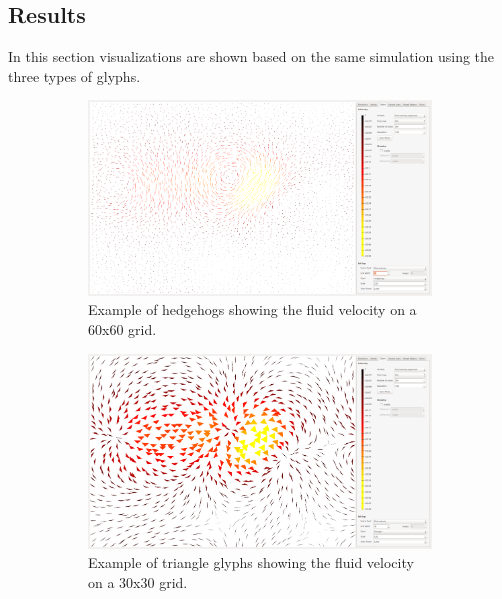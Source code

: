 \subsection{Results} %
\label{ssec:glyphs:results}
In this section visualizations are shown based on the same simulation using the three types of glyphs.
\begin{figure}[tb]
	\centering
	\begin{subfigure}{0.6\textwidth}
	\centering
	\includegraphics[width=\textwidth, trim={35px 30px 430px 30px},clip]{img/glyphs/hedgehogs.png}
	\caption{Example of hedgehogs showing the fluid velocity on a 60x60 grid.}
	\label{fig:glyphs:hedgehogs}
	\end{subfigure}
	\begin{subfigure}{0.6\textwidth}
		\centering
		\includegraphics[width=\textwidth, trim={35px 30px 430px 30px},clip]{img/glyphs/triangles.png}
		\caption{Example of triangle glyphs showing the fluid velocity on a 30x30 grid.}
		\label{fig:glyphs:triangles}
	\end{subfigure}
	\begin{subfigure}{0.6\textwidth}

\end{subfigure}
\end{figure}
